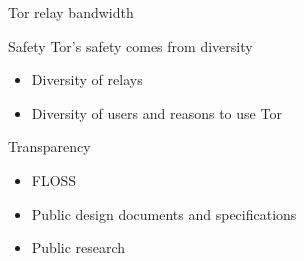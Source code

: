 \documentclass[aspectratio=169,10pt]{beamer}
\begin{document}
  
  \begin{frame}[fragile]{Tor relay bandwidth}
    \begin{center}
    \end{center}
  \end{frame}
  
  
  \begin{frame}[fragile]{Safety}
    Tor's safety comes from diversity
    \begin{itemize}
      \item Diversity of relays
      \item Diversity of users and reasons to use Tor
    \end{itemize}
    
    Transparency
    \begin{itemize}
      \item FLOSS
      \item Public design documents and specifications
      \item Public research
    \end{itemize}
  \end{frame}
  
\end{document}
